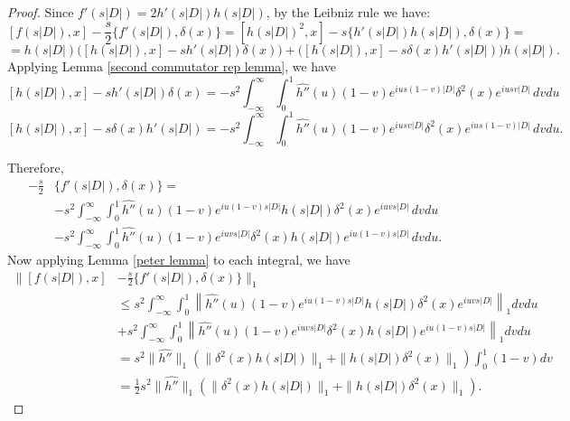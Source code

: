     \begin{proof}
        Since $f'(s|D|) = 2h'(s|D|)h(s|D|)$, by the Leibniz rule we have:
        $$[f(s|D|),x]-\frac{s}{2}\{f'(s|D|),\delta(x)\} = [h(s|D|)^2,x]-s\{h'(s|D|)h(s|D|),\delta(x)\}=$$
        $$= h(s|D|)\big([h(s|D|),x]-sh'(s|D|)\delta(x)\big)+\big([h(s|D|),x]-s\delta(x)h'(s|D|)\big)h(s|D|).$$
        Applying Lemma \ref{second commutator rep lemma}, we have
        $$[h(s|D|),x]-sh'(s|D|)\delta(x) = -s^2\int_{-\infty}^\infty \int_0^1 \widehat{h''}(u)(1-v)e^{ius(1-v)|D|}\delta^2(x)e^{iusv|D|}\,dvdu$$
        $$[h(s|D|),x]-s\delta(x)h'(s|D|) = -s^2\int_{-\infty}^\infty \int_0^1 \widehat{h''}(u)(1-v)e^{iusv|D|}\delta^2(x)e^{ius(1-v)|D|}\,dvdu.$$
        
        Therefore,
        \begin{align*}
            [f(s|D|),x] - \frac{s}{2}&\{f'(s|D|),\delta(x)\}= \\
            & -s^2\int_{-\infty}^\infty \int_0^1 \widehat{h''}(u)(1-v)e^{iu(1-v)s|D|}h(s|D|)\delta^2(x)e^{iuvs|D|}\,dvdu\\
            & -s^2\int_{-\infty}^\infty \int_0^1 \widehat{h''}(u)(1-v)e^{iuvs|D|}\delta^2(x)h(s|D|)e^{iu(1-v)s|D|}\,dvdu.
        \end{align*}
        Now applying Lemma \ref{peter lemma} to each integral, we have
        \begin{align*} 
             \|[f(s|D|),x]&-\frac{s}{2}\{f'(s|D|),\delta(x)\}\|_1 \\ 
                               &\leq s^2\int_{-\infty}^\infty \int_0^1 \left\|\widehat{h''}(u)(1-v)e^{iu(1-v)s|D|}h(s|D|)\delta^2(x)e^{iuvs|D|}\right\|_1dvdu\\
                               &+s^2\int_{-\infty}^\infty \int_0^1 \left\|\widehat{h''}(u)(1-v)e^{iuvs|D|}\delta^2(x)h(s|D|)e^{iu(1-v)s|D|}\right\|_1dvdu\\ 
                               &= s^2\|\widehat{h''}\|_1(\|\delta^2(x)h(s|D|)\|_1+\|h(s|D|)\delta^2(x)\|_1)\int_0^1(1-v)dv\\ 
                               &= \frac{1}{2}s^2\|\widehat{h''}\|_1(\|\delta^2(x)h(s|D|)\|_1+\|h(s|D|)\delta^2(x)\|_1). 
        \end{align*}
% 
    \end{proof}

